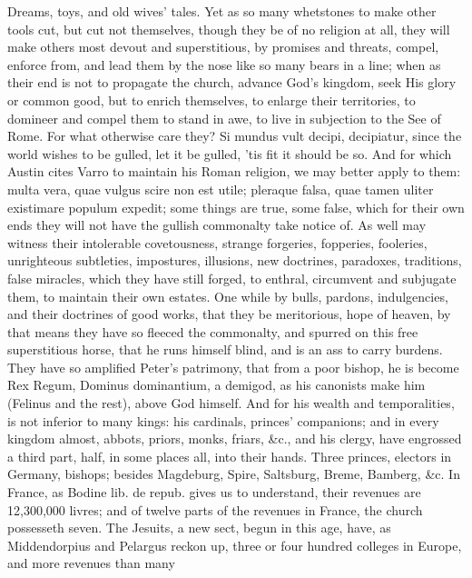 {Dreams, toys, and old wives' tales. Yet as so many whetstones to
make other tools cut, but cut not themselves, though they be of no
religion at all, they will make others most devout and superstitious,
by promises and threats, compel, enforce from, and lead them by the
nose like so many bears in a line; when as their end is not to
propagate the church, advance God's kingdom, seek His glory or common
good, but to enrich themselves, to enlarge their territories, to
domineer and compel them to stand in awe, to live in subjection to the
See of Rome. For what otherwise care they? Si mundus vult decipi,
decipiatur, since the world wishes to be gulled, let it be gulled, 'tis
fit it should be so. And for which Austin cites Varro to maintain
his Roman religion, we may better apply to them: multa vera, quae
vulgus scire non est utile; pleraque falsa, quae tamen uliter
existimare populum expedit; some things are true, some false, which for
their own ends they will not have the gullish commonalty take notice
of. As well may witness their intolerable covetousness, strange
forgeries, fopperies, fooleries, unrighteous subtleties, impostures,
illusions, new doctrines, paradoxes, traditions, false miracles, which
they have still forged, to enthral, circumvent and subjugate them, to
maintain their own estates. One while by bulls, pardons,
indulgencies, and their doctrines of good works, that they be
meritorious, hope of heaven, by that means they have so fleeced the
commonalty, and spurred on this free superstitious horse, that he runs
himself blind, and is an ass to carry burdens. They have so amplified
Peter's patrimony, that from a poor bishop, he is become Rex Regum,
Dominus dominantium, a demigod, as his canonists make him (Felinus and
the rest), above God himself. And for his wealth and 
temporalities, is not inferior to many kings: his cardinals,
princes' companions; and in every kingdom almost, abbots, priors,
monks, friars, \&c., and his clergy, have engrossed a third part,
half, in some places all, into their hands. Three princes, electors in
Germany, bishops; besides Magdeburg, Spire, Saltsburg, Breme, Bamberg,
\&c. In France, as Bodine lib. de repub. gives us to understand, their
revenues are 12,300,000 livres; and of twelve parts of the revenues in
France, the church possesseth seven. The Jesuits, a new sect, begun in
this age, have, as Middendorpius and Pelargus reckon up,
three or four hundred colleges in Europe, and more revenues than many
}
